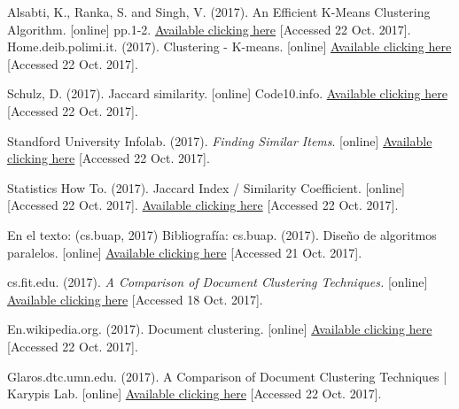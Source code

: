 \documentclass[fleqn,10pt]{SelfArx} %
\begin{document}
\begin{thebibliography}{9}

Alsabti, K., Ranka, S. and Singh, V. (2017). An Efficient K-Means Clustering Algorithm. [online] pp.1-2. \href{https://www.cs.utexas.edu/~kuipers/readings/Alsabti-hpdm-98.pdf}{Available clicking here} [Accessed 22 Oct. 2017].
Home.deib.polimi.it. (2017). Clustering - K-means. [online] \href{http://home.deib.polimi.it/matteucc/Clustering/tutorial_html/kmeans.html}{Available clicking here} [Accessed 22 Oct. 2017].


Schulz, D. (2017). Jaccard similarity. [online] Code10.info. 
\href{http://www.code10.info/index.php?option=com_content&view=article&id=60:articlejaccard-similarity&catid=38:cat_coding_algorithms_data-similarity&Itemid=57}{Available clicking here} [Accessed 22 Oct. 2017].


Standford University Infolab. (2017). \textit{Finding Similar Items}. [online] \href{http://infolab.stanford.edu/~ullman/mmds/ch3.pdf}{Available clicking here} [Accessed 22 Oct. 2017].

Statistics How To. (2017). Jaccard Index / Similarity Coefficient. [online] [Accessed 22 Oct. 2017].
\href{http://www.statisticshowto.com/jaccard-index/}{Available clicking here}  [Accessed 22 Oct. 2017].


En el texto: (cs.buap, 2017)
Bibliografía: cs.buap. (2017). Diseño de algoritmos paralelos. [online] \href{https://www.cs.buap.mx/~mtovar/doc/ProgConc/ProgramacionParalela.pdf}{Available clicking here} [Accessed 21 Oct. 2017].
\item cs.fit.edu. (2017). \textit{A Comparison of Document Clustering Techniques.} [online]  \href{http://cs.fit.edu/~pkc/classes/ml-internet/papers/steinbach00tr.pdf}{Available clicking here} [Accessed 18 Oct. 2017].

En.wikipedia.org. (2017). Document clustering. [online] \href{https://en.wikipedia.org/wiki/Document_clustering}{Available clicking here} [Accessed 22 Oct. 2017].

Glaros.dtc.umn.edu. (2017). A Comparison of Document Clustering Techniques | Karypis Lab. [online] \href{http://glaros.dtc.umn.edu/gkhome/node/157}{Available clicking here} [Accessed 22 Oct. 2017].
\end{thebibliography}



\end{document}
